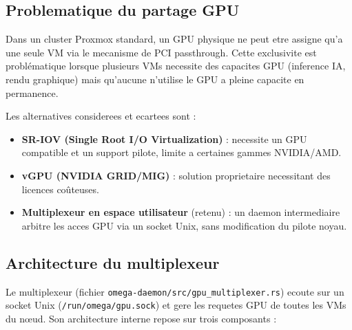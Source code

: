 \subsection{Problematique du partage GPU}
\label{subsec:problematique-gpu}

Dans un cluster Proxmox standard, un GPU physique ne peut etre assigne qu'a une seule VM via le mecanisme de PCI passthrough. Cette exclusivite est problématique lorsque plusieurs VMs necessite des capacites GPU (inference IA, rendu graphique) mais qu'aucune n'utilise le GPU a pleine capacite en permanence.

Les alternatives considerees et ecartees sont :

\begin{itemize}
    \item \textbf{SR-IOV (Single Root I/O Virtualization)} : necessite un GPU compatible et un support pilote, limite a certaines gammes NVIDIA/AMD.
    \item \textbf{vGPU (NVIDIA GRID/MIG)} : solution proprietaire necessitant des licences coûteuses.
    \item \textbf{Multiplexeur en espace utilisateur} (retenu) : un daemon intermediaire arbitre les acces GPU via un socket Unix, sans modification du pilote noyau.
\end{itemize}

\subsection{Architecture du multiplexeur}
\label{subsec:architecture-mux}

Le multiplexeur (fichier \texttt{omega-daemon/src/gpu\_multiplexer.rs}) ecoute sur un socket Unix (\texttt{/run/omega/gpu.sock}) et gere les requetes GPU de toutes les VMs du nœud. Son architecture interne repose sur trois composants :

